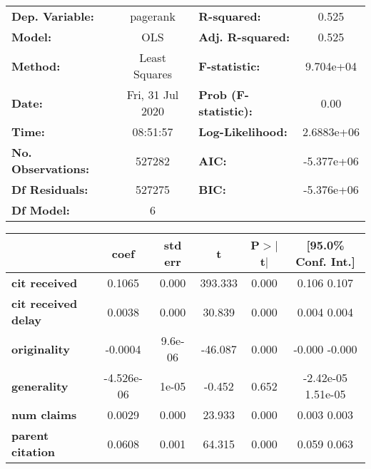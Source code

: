 \begin{center}
\begin{tabular}{lclc}
\toprule
\textbf{Dep. Variable:}     &     pagerank     & \textbf{  R-squared:         } &       0.525    \\
\textbf{Model:}             &       OLS        & \textbf{  Adj. R-squared:    } &       0.525    \\
\textbf{Method:}            &  Least Squares   & \textbf{  F-statistic:       } &   9.704e+04    \\
\textbf{Date:}              & Fri, 31 Jul 2020 & \textbf{  Prob (F-statistic):} &       0.00     \\
\textbf{Time:}              &     08:51:57     & \textbf{  Log-Likelihood:    } &   2.6883e+06   \\
\textbf{No. Observations:}  &      527282      & \textbf{  AIC:               } &   -5.377e+06   \\
\textbf{Df Residuals:}      &      527275      & \textbf{  BIC:               } &   -5.376e+06   \\
\textbf{Df Model:}          &           6      & \textbf{                     } &                \\
\bottomrule
\end{tabular}
\begin{tabular}{lccccc}
                            & \textbf{coef} & \textbf{std err} & \textbf{t} & \textbf{P$>$$|$t$|$} & \textbf{[95.0\% Conf. Int.]}  \\
\midrule
\textbf{cit received}       &       0.1065  &        0.000     &   393.333  &         0.000        &         0.106     0.107       \\
\textbf{cit received delay} &       0.0038  &        0.000     &    30.839  &         0.000        &         0.004     0.004       \\
\textbf{originality}        &      -0.0004  &      9.6e-06     &   -46.087  &         0.000        &        -0.000    -0.000       \\
\textbf{generality}         &   -4.526e-06  &        1e-05     &    -0.452  &         0.652        &     -2.42e-05  1.51e-05       \\
\textbf{num claims}         &       0.0029  &        0.000     &    23.933  &         0.000        &         0.003     0.003       \\
\textbf{parent citation}    &       0.0608  &        0.001     &    64.315  &         0.000        &         0.059     0.063       \\

\end{tabular}
\end{center}
